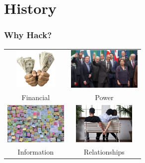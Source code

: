 \documentclass[10pt]{beamer}
\begin{document}
  \section[History]{History}
  \begin{frame}
    \frametitle{Why Hack?}
    \centering
    \begin{tabular}{c c}
      \includegraphics[height=2cm,keepaspectratio]{money.jpg}     &
      \includegraphics[height=2cm,keepaspectratio]{leaders.jpg}  \\
      Financial                                                   &
      Power                                                      \\
      \includegraphics[height=2cm,keepaspectratio]{info.jpg}      &
      \includegraphics[height=2cm,keepaspectratio]{cheating.jpg} \\
      Information                                                 &
      Relationships                                              \\
    \end{tabular}
  \end{frame}
\end{document}
